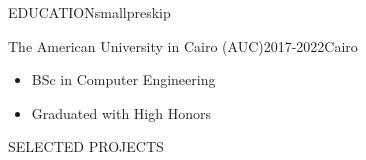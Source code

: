 \documentclass{resume}
\begin{document}
\begin{minipage}[t]{0.54\textwidth}

	\begin{rsection}{\MakeUppercase{education}}{smallpreskip}

		\begin{rcontent}{The American University in Cairo (AUC)}{2017-2022}{}{Cairo}
			\begin{itemize}
				\item BSc in Computer Engineering
				\item Graduated with High Honors
			\end{itemize}
		\end{rcontent}

	\end{rsection}

	\begin{rsection}{\MakeUppercase{selected projects}}{}


\end{rsection}
\end{minipage}
\end{document}
